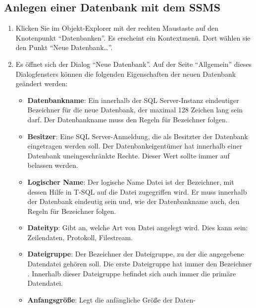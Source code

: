       \subsection{Anlegen einer Datenbank mit dem SSMS}
        \begin{enumerate}
          \item Klicken Sie im Objekt-Explorer mit der rechten Maustaste
          auf den Knotenpunkt \enquote{Datenbanken}. Es erscheint ein
          Kontextmenü. Dort wählen sie den Punkt \enquote{Neue
          Datenbank\ldots}.
          \item Es öffnet sich der Dialog \enquote{Neue Datenbank}.
          Auf der Seite \enquote{Allgemein} dieses Dialogfensters können die
          folgenden Eigenschaften der neuen Datenbank geändert werden:
          \begin{itemize}
            \item \textbf{Datenbankname}: Ein innerhalb der SQL Server-Instanz
            eindeutiger Bezeichner für die neue Datenbank, der maximal 128
            Zeichen lang sein darf. Der Datenbankname muss den Regeln für
            Bezeichner folgen.
            \item \textbf{Besitzer}: Eine SQL Server-Anmeldung, die als
            Besitzter der Datenbank eingetragen werden soll. Der
            Datenbankeigentümer hat innerhalb einer Datenbank uneingeschränkte
            Rechte. Dieser Wert sollte immer auf 
            belassen werden.
            \item \textbf{Logischer Name}: Der logische Name Datei ist der
            Bezeichner, mit dessen Hilfe in T-SQL auf die Datei zugegriffen
            wird. Er muss innerhalb der Datenbank eindeutig sein und, wie der
            Datenbankname auch, den Regeln für Bezeichner folgen.
            \item \textbf{Dateityp}: Gibt an, welche Art von Datei angelegt
            wird. Dies kann sein: Zeilendaten, Protokoll, Filestream.
            \item \textbf{Dateigruppe}: Der Bezeichner der Dateigruppe, zu der
            die angegebene Datendatei gehören soll. Die erste Dateigruppe hat
            immer den Bezeichner . Innerhalb dieser
            Dateigruppe befindet sich auch immer die primäre Datendatei.
            \item \textbf{Anfangsgröße}: Legt die anfängliche Größe der Daten-

\end{itemize}
\end{enumerate}
